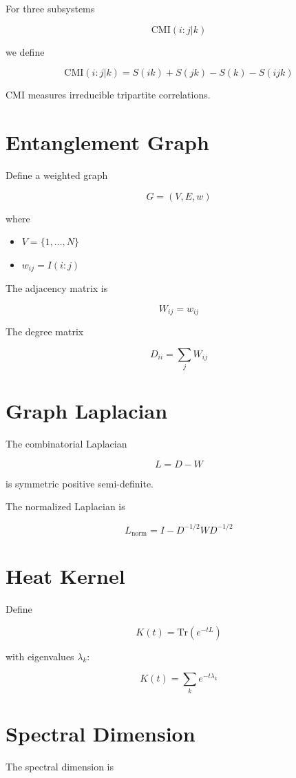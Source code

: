 \documentclass[11pt,a4paper]{article}
\begin{document}
For three subsystems

\[
\mathrm{CMI}(i:j|k)
\]

we define

\[
\mathrm{CMI}(i:j|k)
=
S(ik)+S(jk)-S(k)-S(ijk)
\]

CMI measures irreducible tripartite correlations.

\section{Entanglement Graph}

Define a weighted graph

\[
G=(V,E,w)
\]

where

\begin{itemize}
\item $V=\{1,\dots,N\}$
\item $w_{ij}=I(i:j)$
\end{itemize}

The adjacency matrix is

\[
W_{ij}=w_{ij}
\]

The degree matrix

\[
D_{ii}=\sum_j W_{ij}
\]

\section{Graph Laplacian}

The combinatorial Laplacian

\[
L=D-W
\]

is symmetric positive semi-definite.

The normalized Laplacian is

\[
L_{\text{norm}} = I - D^{-1/2}WD^{-1/2}
\]

\section{Heat Kernel}

Define

\[
K(t)=\mathrm{Tr}(e^{-tL})
\]

with eigenvalues $\lambda_k$:

\[
K(t)=\sum_k e^{-t\lambda_k}
\]

\section{Spectral Dimension}

The spectral dimension is
\end{document}
